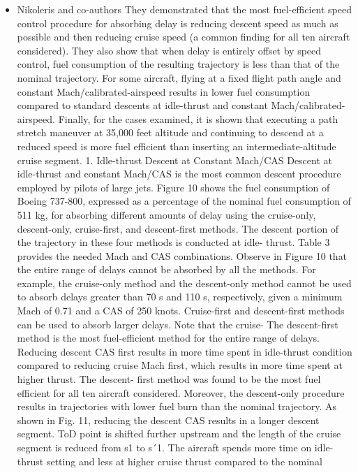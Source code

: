 \documentclass{aer1315-pretty}
\begin{document}
\begin{itemize}
\item Nikoleris and co-authors \cite{Niko:2012} 
They demonstrated that the most fuel-efficient speed control procedure for absorbing delay is reducing descent speed as much as possible and then reducing cruise speed (a common finding for all ten aircraft considered). They also show that when delay is entirely offset by speed control, fuel consumption of the resulting trajectory is less than that of the nominal trajectory. For some aircraft, flying at a fixed flight path angle and constant Mach/calibrated-airspeed results in lower fuel consumption compared to standard descents at idle-thrust and constant Mach/calibrated-airspeed. Finally, for the cases examined, it is shown that executing a path stretch maneuver at 35,000 feet altitude and continuing to descend at a reduced speed is more fuel efficient than inserting an intermediate-altitude cruise segment.
1. Idle-thrust Descent at Constant Mach/CAS
    Descent at idle-thrust and constant Mach/CAS is
the most common descent procedure employed by
pilots of large jets. Figure 10 shows the fuel
consumption of Boeing 737-800, expressed as a
percentage of the nominal fuel consumption of 511
kg, for absorbing different amounts of delay using
the cruise-only, descent-only, cruise-first, and
descent-first methods. The descent portion of the
trajectory in these four methods is conducted at idle-
thrust. Table 3 provides the needed Mach and CAS
combinations. Observe in Figure 10 that the entire
range of delays cannot be absorbed by all the
methods. For example, the cruise-only method and
the descent-only method cannot be used to absorb
delays greater than 70 s and 110 s, respectively,
given a minimum Mach of 0.71 and a CAS of 250
knots. Cruise-first and descent-first methods can be
used to absorb larger delays. Note that the cruise-
    The descent-first method is the
most fuel-efficient method for the
entire range of delays. Reducing
descent CAS first results in more
time spent in idle-thrust condition
compared to reducing cruise Mach
first, which results in more time
spent at higher thrust. The descent-
first method was found to be the
most fuel efficient for all ten
aircraft considered.
    Moreover, the descent-only
procedure results in trajectories
with lower fuel burn than the
nominal trajectory. As shown in
Fig. 11, reducing the descent CAS
results in a longer descent segment.
ToD point is shifted further
upstream and the length of the
cruise segment is reduced from s1 to
s´1. The aircraft spends more time on idle-thrust setting and less at higher cruise thrust compared to the nominal

\end{itemize}
\end{document}
